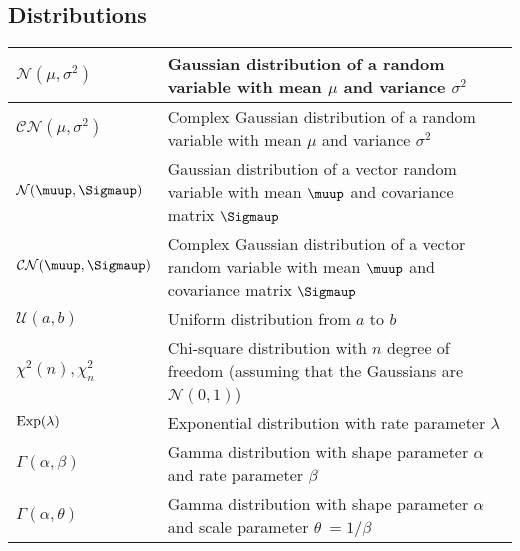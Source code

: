 \subsection{Distributions}
\begin{xltabular}{\textwidth}{XX}
	\(\mathcal{N}(\mu, \sigma^2)\) \cite{papoulisProbabilityRandomVariables2001}                                & Gaussian distribution of a random variable with mean \(\mu\) and variance \(\sigma^{2}\)                                                                           \\ \hline
	\(\mathcal{CN}(\mu, \sigma^2)\)                               & Complex Gaussian distribution of a random variable with mean \(\mu\) and variance \(\sigma^{2}\)                                                                   \\ \hline
	\(\mathcal{N}(\boldsymbol{\muup}, \boldsymbol{\Sigmaup})\)    & Gaussian distribution of a vector random variable with mean \(\boldsymbol{\muup}\) and covariance matrix \(\boldsymbol{\Sigmaup}\)                                 \\ \hline
	\(\mathcal{CN}(\boldsymbol{\muup}, \boldsymbol{\Sigmaup})\)   & Complex Gaussian distribution of a vector random variable with mean \(\boldsymbol{\muup}\) and covariance matrix \(\boldsymbol{\Sigmaup}\)                         \\ \hline
	\(\mathcal{U}(a,b)\)                                          & Uniform distribution from \(a\) to \(b\)                                                                                                                           \\ \hline
	\(\chi^2 (n), \chi^2_n\)                                      & Chi-square distribution with \(n\) degree of freedom (assuming that the Gaussians are \(\mathcal{N}(0,1)\))                                                        \\ \hline
	\(\textnormal{Exp}(\lambda)\)                                 & Exponential distribution with rate parameter \(\lambda\)                                                                                                           \\ \hline
	\(\Gamma(\alpha, \beta)\)                                     & Gamma distribution with shape parameter \(\alpha\) and rate parameter \(\beta\)                                                                                    \\ \hline
	\(\Gamma(\alpha, \theta)\)                                    & Gamma distribution with shape parameter \(\alpha\) and scale parameter \(\theta\ = 1/\beta\)                                                                       \\ \hline

\end{xltabular}

